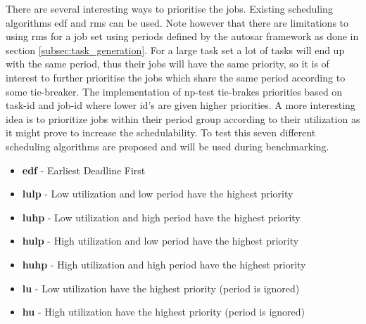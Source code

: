 \documentclass{kththesis}
\begin{document}
There are several interesting ways to prioritise the jobs. Existing scheduling algorithms
\acrshort{edf} and \acrshort{rms} can be used. Note however that there are limitations to using
\acrshort{rms} for a job set using periods defined by the \acrshort{autosar} framework as done in
section \ref{subsec:task_generation}. For a large task set a lot of tasks will end up with the same
period, thus their jobs will have the same priority, so it is of interest to further prioritise the
jobs which share the same period according to some tie-breaker. The implementation of
\acrshort{np}-test tie-brakes priorities based on task-id and job-id where lower id's are given
higher priorities. A more interesting idea is to prioritize jobs within their period group according
to their utilization as it might prove to increase the schedulability. To test this seven different
scheduling algorithms are proposed and will be used during benchmarking.

\begin{itemize}
    \item \textbf{\acrshort{edf}} - Earliest Deadline First
    \item \textbf{\acrshort{lulp}} - Low utilization and low period have the highest priority
    \item \textbf{\acrshort{luhp}} - Low utilization and high period have the highest priority
    \item \textbf{\acrshort{hulp}} - High utilization and low period have the highest priority
    \item \textbf{\acrshort{huhp}} - High utilization and high period have the highest priority
    \item \textbf{\acrshort{lu}} - Low utilization have the highest priority (period is ignored)
    \item \textbf{\acrshort{hu}} - High utilization have the highest priority (period is ignored)
\end{itemize}
\end{document}
